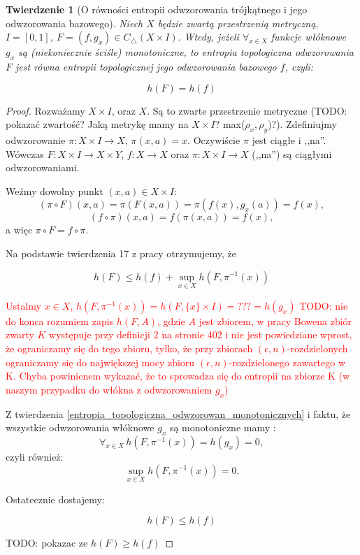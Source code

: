 \documentclass[licencjacka]{pwr_wmat_praca_dyplomowa}
\theoremstyle{plain}
\newtheorem{theorem}{Twierdzenie}
\numberwithin{theorem}{chapter}
\theoremstyle{definition}
\numberwithin{theorem}{chapter}
\begin{document}
\begin{theorem}[O równości entropii odwzorowania trójkątnego i jego odwzorowania bazowego]
\label{rownosc_entropii_gdy_wlokna_monotoniczne}
Niech $X$ będzie zwartą przestrzenią metryczną, $I = [0, 1]$, $F = (f, g_x) \in C_\triangle(X \times I).$ Wtedy, jeżeli $\forall_{x \in X}$ funkcje włóknowe $g_x$ są (niekoniecznie ściśle) monotoniczne, to entropia topologiczna odwzorowania $F$ jest równa entropii topologicznej jego odwzorowania bazowego $f$, czyli:

$$h(F) = h(f)$$
\end{theorem}

\begin{proof}

Rozważamy $X \times I$, oraz $X.$ Są to zwarte przestrzenie metryczne (TODO: pokazać zwartość? Jaką metrykę mamy na $X \times I$? max($\rho_x, \rho_y$)?).
Zdefiniujmy odwzorowanie $\pi: X \times I \rightarrow X$, $\pi(x,a) = x$. Oczywiście $\pi$ jest ciągłe i ,,na''.
Wówczas $F: X \times I \rightarrow X \times Y$, $f: X \rightarrow X$ oraz $\pi: X \times I \rightarrow X$ (,,na'') są ciągłymi odwzorowaniami. 

Weźmy dowolny punkt $(x, a) \in X \times I$:
$$(\pi \circ F)(x, a) = \pi(F(x,a)) = \pi(f(x), g_x(a)) = f(x),$$
$$(f \circ \pi)(x, a) = f(\pi(x,a)) = f(x),$$
a więc $\pi \circ F = f \circ \pi.$


Na podstawie twierdzenia 17 z pracy  \cite[s.~103]{bowen1971entropy__do_dowodu_rownosci_topologicznej_entropii_2_twierdzenie17} otrzymujemy, że 

$$h(F) \leq h(f) + \sup_{x \in X} h(F, \pi^{-1}(x))$$

\textcolor{red}{Ustalmy $x \in X$, $h(F, \pi^{-1}(x)) = h(F, \{x\} \times I) =???= h(g_x)$ TODO: nie do konca rozumiem zapis $h(F, A)$, gdzie $A$ jest zbiorem, w pracy Bowena zbiór zwarty $K$ występuje przy definicji 2 na stronie 402 i nie jest powiedziane wprost, że ograniczamy się do tego zbioru, tylko, że przy zbiorach $(\epsilon, n)$-rozdzielonych ograniczamy się do największej mocy zbioru $(\epsilon, n)$-rozdzielonego zawartego w K. Chyba powinienem wykazać, że to sprowadza się do entropii na zbiorze K (w naszym przypadku do włókna z odwzorowaniem $g_x$)}

Z twierdzenia \ref{entropia_topologiczna_odwzorowan_monotonicznych} i faktu, że wszystkie odwzorowania włóknowe $g_x$ są monotoniczne mamy :
$$\forall_{x \in X} \, h(F, \pi^{-1}(x)) = h(g_x) = 0,$$
czyli również:
$$\sup_{x \in X} h(F, \pi^{-1}(x)) = 0.$$

Ostatecznie dostajemy:

$$h(F) \leq h(f)$$

TODO: pokazac ze $h(F) \geq h(f)$

\end{proof}
\end{document}
